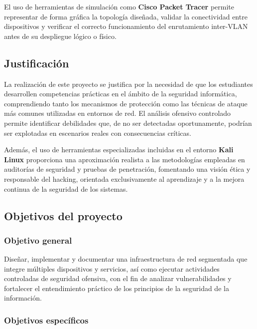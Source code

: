 El uso de herramientas de simulación como \textbf{Cisco Packet Tracer} permite representar de forma gráfica la topología diseñada, validar la conectividad entre dispositivos y verificar el correcto funcionamiento del enrutamiento inter-VLAN antes de su despliegue lógico o físico.

\subsection{Justificación}

La realización de este proyecto se justifica por la necesidad de que los estudiantes desarrollen competencias prácticas en el ámbito de la seguridad informática, comprendiendo tanto los mecanismos de protección como las técnicas de ataque más comunes utilizadas en entornos de red. El análisis ofensivo controlado permite identificar debilidades que, de no ser detectadas oportunamente, podrían ser explotadas en escenarios reales con consecuencias críticas.

Además, el uso de herramientas especializadas incluidas en el entorno \textbf{Kali Linux} proporciona una aproximación realista a las metodologías empleadas en auditorías de seguridad y pruebas de penetración, fomentando una visión ética y responsable del hacking, orientada exclusivamente al aprendizaje y a la mejora continua de la seguridad de los sistemas.

\subsection{Objetivos del proyecto}

\subsubsection{Objetivo general}

Diseñar, implementar y documentar una infraestructura de red segmentada que integre múltiples dispositivos y servicios, así como ejecutar actividades controladas de seguridad ofensiva, con el fin de analizar vulnerabilidades y fortalecer el entendimiento práctico de los principios de la seguridad de la información.

\subsubsection{Objetivos específicos}

